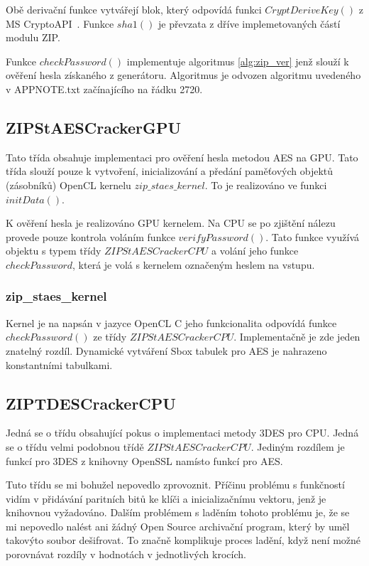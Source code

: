  Obě derivační funkce vytvářejí blok, který odpovídá funkci $CryptDeriveKey()$ z MS
CryptoAPI~\cite{CryptoAPI}. Funkce $sha1()$ je převzata z dříve implemetovaných částí modulu ZIP.

 Funkce $checkPassword()$ implementuje algoritmus \ref{alg:zip_ver} jenž slouží k ověření hesla
získaného z generátoru. Algoritmus je odvozen algoritmu uvedeného v APPNOTE.txt začínajícího na
řádku 2720.

\subsection{ZIPStAESCrackerGPU}
Tato třída obsahuje implementaci pro ověření hesla metodou AES na GPU. Tato třída slouží pouze k
vytvoření, inicializování a předání paměťových objektů (zásobníků) OpenCL kernelu
$zip\_staes\_kernel$. To je realizováno ve funkci $initData()$. 

 K ověření hesla je realizováno GPU kernelem. Na CPU se po zjištění nálezu provede pouze
kontrola voláním funkce $verifyPassword()$. Tato funkce využívá objektu s typem třídy
$ZIPStAESCrackerCPU$ a volání jeho funkce $checkPassword$, která je volá s kernelem označeným
heslem na vstupu.

\subsubsection{zip\_staes\_kernel}
Kernel je na napsán v jazyce OpenCL C jeho funkcionalita odpovídá funkce $checkPassword()$ ze
třídy $ZIPStAESCrackerCPU$. Implementačně je zde jeden znatelný rozdíl. Dynamické vytváření Sbox
tabulek pro AES je nahrazeno konstantními tabulkami.
 
\subsection{ZIPTDESCrackerCPU}
Jedná se o třídu obsahující pokus o implementaci metody 3DES pro CPU. Jedná se o třídu velmi
podobnou třídě $ZIPStAESCrackerCPU$. Jediným rozdílem je funkcí pro 3DES z knihovny OpenSSL
namísto funkcí pro AES.

 Tuto třídu se mi bohužel nepovedlo zprovoznit. Příčinu problému s funkčností vidím v přidávání
paritních bitů ke klíči a inicializačnímu vektoru, jenž je knihovnou vyžadováno. Dalším
problémem s laděním tohoto problému je, že se mi nepovedlo nalést ani žádný Open Source
archivační program, který by uměl takovýto soubor dešifrovat. To značně komplikuje proces ladění,
když není možné porovnávat rozdíly v hodnotách v jednotlivých krocích.

